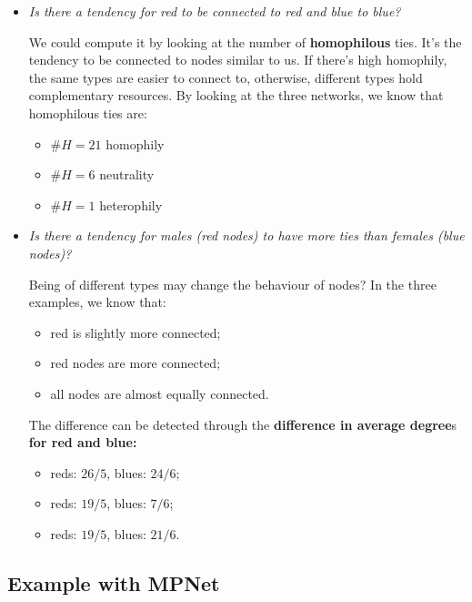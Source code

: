 \documentclass[
  notitlepage,
  onecolumn,
  openany]{book}
\providecommand{\tightlist}{%
  \setlength{\itemsep}{0pt}\setlength{\parskip}{0pt}}
\begin{document}
\begin{itemize}
\item
  \emph{Is there a tendency for red to be connected to red and blue to blue?}

  We could compute it by looking at the number of \textbf{homophilous} ties. It's the tendency to be connected to nodes similar to us. If there's high homophily, the same types are easier to connect to, otherwise, different types hold complementary resources. By looking at the three networks, we know that homophilous ties are:

  \begin{itemize}
  \tightlist
  \item
    \(\# H = 21\) homophily
  \item
    \(\# H = 6\) neutrality
  \item
    \(\# H = 1\) heterophily
  \end{itemize}
\item
  \emph{Is there a tendency for males (red nodes) to have more ties than females (blue nodes)?}

  Being of different types may change the behaviour of nodes? In the three examples, we know that:

  \begin{itemize}
  \tightlist
  \item
    red is slightly more connected;
  \item
    red nodes are more connected;
  \item
    all nodes are almost equally connected.
  \end{itemize}

  The difference can be detected through the \textbf{difference in average degree}s \textbf{for red and blue:}

  \begin{itemize}
  \tightlist
  \item
    reds: \(26/5\), blues: \(24/6\);
  \item
    reds: \(19/5\), blues: \(7/6\);
  \item
    reds: \(19/5\), blues: \(21/6\).
  \end{itemize}
\end{itemize}

\hypertarget{example-with-mpnet}{%
\subsection{Example with MPNet}\label{example-with-mpnet}}
\end{document}
